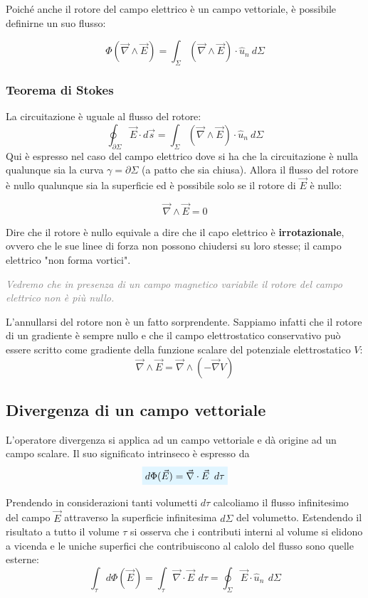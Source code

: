 \documentclass[x11names]{report}
\newcommand{\teorema}[2]{
	\begin{center}
		\fboxsep11pt
		\colorbox{myred}{\begin{minipage}{5.75in}
				\begin{redes}{#1}
					#2
				\end{redes}
		\end{minipage}}
	\end{center}
}
\newcommand{\viola}[1]{%
	\colorbox{myblue}{$\displaystyle #1$}
}
\begin{document}
Poiché anche il rotore del campo elettrico è un campo vettoriale, è possibile definirne un suo flusso:

\[
\Phi(\vec{\nabla} \wedge \vec{E}) =  \int_{\Sigma}\left(\vec{\nabla} \wedge \vec{E}\right)\cdot \hat{u}_n \: d\Sigma
\]

\teorema{}{\label{stokes}
\subsubsection{Teorema di Stokes}
La circuitazione è uguale al flusso del rotore:
\[
\oint_{\partial\Sigma} \vec{E}\cdot d\vec{s} = \int_{\Sigma}\left(\vec{\nabla} \wedge \vec{E}\right)\cdot \hat{u}_n \: d\Sigma
\]
Qui è espresso nel caso del campo elettrico dove si ha che la circuitazione è nulla qualunque sia la curva \(\gamma = \partial \Sigma\) (a patto che sia chiusa). Allora il flusso del rotore è nullo qualunque sia la superficie ed è possibile solo se il rotore di \(\vec{E}\) è nullo:

\[
\vec{\nabla} \wedge \vec{E} = 0
\]

Dire che il rotore è nullo equivale a dire che il capo elettrico è \textbf{irrotazionale}, ovvero che le sue linee di forza non possono chiudersi su loro stesse; il campo elettrico "non forma vortici".

\textcolor{gray}{\textit{Vedremo che in presenza di un campo magnetico variabile il rotore del campo elettrico non è più nullo.}}
}

L'annullarsi del rotore non è un fatto sorprendente. Sappiamo infatti che il rotore di un gradiente è sempre nullo e che il campo elettrostatico conservativo può essere scritto come gradiente della funzione scalare del potenziale elettrostatico \(V\):
\[
\vec{\nabla} \wedge \vec{E} = \vec{\nabla} \wedge \left(-\vec{\nabla} V\right)
\]

\subsection{Divergenza di un campo vettoriale}
L'operatore divergenza si applica ad un campo vettoriale e dà origine ad un campo scalare. Il suo significato intrinseco è espresso da 
\begin{equation}
	\viola{d\Phi(\vec{E}) = \vec{\nabla}\cdot\vec{E}\,\ d\tau}
\end{equation}


Prendendo in considerazioni tanti volumetti \(d\tau\) calcoliamo il flusso infinitesimo del campo \(\vec{E}\) attraverso la superficie infinitesima \(d\Sigma\) del volumetto. Estendendo il risultato a tutto il volume \(\tau\) si osserva che i contributi interni al volume si elidono a vicenda e le uniche superfici che contribuiscono al calolo del flusso sono quelle esterne:
\[
\int_\tau d\Phi(\vec{E}) = \int_\tau  \vec{\nabla}\cdot\vec{E}\,\ d\tau = \oint_\Sigma \vec{E}\cdot\hat{u}_n \,\ d\Sigma
\]
\end{document}
